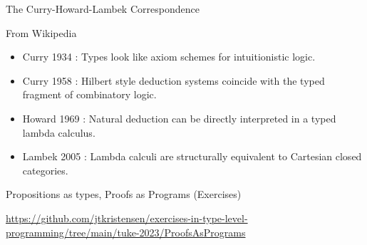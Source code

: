 \documentclass[dvipsnames]{beamer}
\begin{document}
\begin{frame}{The Curry-Howard-Lambek Correspondence}
  \begin{block}{From Wikipedia}
    \begin{itemize}
    \item Curry 1934 : Types look like axiom schemes for intuitionistic logic.
    \item Curry 1958 : Hilbert style deduction systems coincide with the typed fragment of combinatory logic.
    \item Howard 1969 : Natural deduction can be directly interpreted in a typed lambda calculus.
    \item Lambek 2005 : Lambda calculi are structurally equivalent to Cartesian closed categories.
    \end{itemize}
  \end{block}
\end{frame}

\begin{frame}{Propositions as types, Proofs as Programs (Exercises)}
  \begin{center}
    \url{https://github.com/jtkristensen/exercises-in-type-level-programming/tree/main/tuke-2023/ProofsAsPrograms}
  \end{center}
\end{frame}

\end{document}
